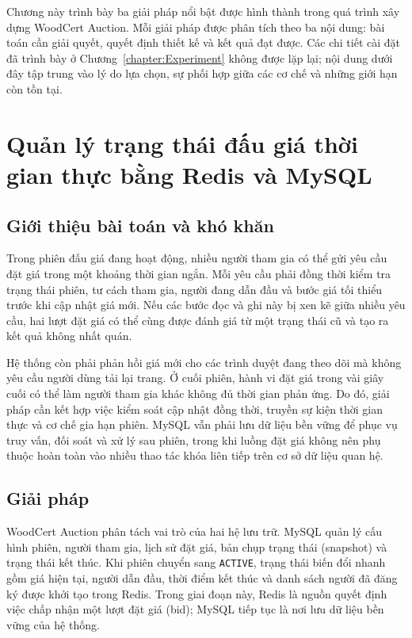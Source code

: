 \documentclass[../DoAn.tex]{subfiles}
\begin{document}
Chương này trình bày ba giải pháp nổi bật được hình thành trong quá trình xây dựng WoodCert Auction. Mỗi giải pháp được phân tích theo ba nội dung: bài toán cần giải quyết, quyết định thiết kế và kết quả đạt được. Các chi tiết cài đặt đã trình bày ở Chương~\ref{chapter:Experiment} không được lặp lại; nội dung dưới đây tập trung vào lý do lựa chọn, sự phối hợp giữa các cơ chế và những giới hạn còn tồn tại.

\section{Quản lý trạng thái đấu giá thời gian thực bằng Redis và MySQL}
\label{sec:hybrid-state-management}

\subsection{Giới thiệu bài toán và khó khăn}

Trong phiên đấu giá đang hoạt động, nhiều người tham gia có thể gửi yêu cầu đặt giá trong một khoảng thời gian ngắn. Mỗi yêu cầu phải đồng thời kiểm tra trạng thái phiên, tư cách tham gia, người đang dẫn đầu và bước giá tối thiểu trước khi cập nhật giá mới. Nếu các bước đọc và ghi này bị xen kẽ giữa nhiều yêu cầu, hai lượt đặt giá có thể cùng được đánh giá từ một trạng thái cũ và tạo ra kết quả không nhất quán.

Hệ thống còn phải phản hồi giá mới cho các trình duyệt đang theo dõi mà không yêu cầu người dùng tải lại trang. Ở cuối phiên, hành vi đặt giá trong vài giây cuối có thể làm người tham gia khác không đủ thời gian phản ứng. Do đó, giải pháp cần kết hợp việc kiểm soát cập nhật đồng thời, truyền sự kiện thời gian thực và cơ chế gia hạn phiên. MySQL vẫn phải lưu dữ liệu bền vững để phục vụ truy vấn, đối soát và xử lý sau phiên, trong khi luồng đặt giá không nên phụ thuộc hoàn toàn vào nhiều thao tác khóa liên tiếp trên cơ sở dữ liệu quan hệ.

\subsection{Giải pháp}

WoodCert Auction phân tách vai trò của hai hệ lưu trữ. MySQL quản lý cấu hình phiên, người tham gia, lịch sử đặt giá, bản chụp trạng thái (snapshot) và trạng thái kết thúc. Khi phiên chuyển sang \texttt{ACTIVE}, trạng thái biến đổi nhanh gồm giá hiện tại, người dẫn đầu, thời điểm kết thúc và danh sách người đã đăng ký được khởi tạo trong Redis. Trong giai đoạn này, Redis là nguồn quyết định việc chấp nhận một lượt đặt giá (bid); MySQL tiếp tục là nơi lưu dữ liệu bền vững của hệ thống.
\end{document}
